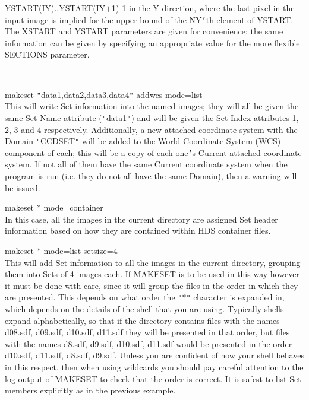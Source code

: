 \documentclass[twoside,11pt]{article}
\renewcommand{\_}{\texttt{\symbol{95}}}
\newcommand{\routine}[1]{{\sc #1}}
\newcommand{\sstexamples}[1]{
   \item[Examples:] \mbox{} \\
   \vspace{-3.5ex}
   \begin{description}
      #1
   \end{description}
}
\newcommand{\sstexamplesubsection}[2]{\sloppy \item{\ssttt #1} \mbox{} \\ #2 }
\newcommand{\sstexamples}[1]{
      \item[Examples:] \\
      \begin{description}
         #1
      \end{description}
      \\
   }
\newcommand{\sstexamplesubsection}[2]{\item[{\ssttt #1}] #2}
\begin{document}
{{{         YSTART(IY)..YSTART(IY$+$1)-1 in the Y direction, where the
         last pixel in the input image is implied for the upper
         bound of the NY{\tt '}th element of YSTART.  The
         XSTART and YSTART parameters are given for convenience; the
         same information can be given by specifying an appropriate
         value for the more flexible SECTIONS parameter.
      }
   }
   \sstexamples{
      \sstexamplesubsection{
         makeset {\tt "}data1,data2,data3,data4{\tt "} addwcs mode=list
      }{
         This will write Set information into the named images; they will
         all be given the same Set Name attribute ({\tt "}data1{\tt "}) and will
         be given the Set Index attributes 1, 2, 3 and 4 respectively.
         Additionally, a new attached coordinate system with the Domain
         {\tt "}CCD\_SET{\tt "} will be added to the World Coordinate System (WCS)
         component of each; this will be a copy of each one{\tt '}s Current
         attached coordinate system.  If not all of them have the
         same Current coordinate system when the program is run
         (i.e. they do not all have the same Domain), then a warning
         will be issued.
      }
      \sstexamplesubsection{
         makeset $*$ mode=container
      }{
         In this case, all the images in the current directory are
         assigned Set header information based on how they are
         contained within HDS container files.
      }
      \sstexamplesubsection{
         makeset $*$ mode=list setsize=4
      }{
         This will add Set information to all the images in the current
         directory, grouping them into Sets of 4 images each.  If \routine{MAKESET}
         is to be used in this way however it must be done with care,
         since it will group the files in the order in which they
         are presented.  This depends on what order the {\tt "}$*${\tt "} character
         is expanded in, which depends on the details of the shell
         that you are using.  Typically shells expand alphabetically,
         so that if the directory contains files with the names
         d08.sdf, d09.sdf, d10.sdf, d11.sdf they will be presented
         in that order, but files with the names d8.sdf, d9.sdf,
         d10.sdf, d11.sdf would be presented in the order d10.sdf,
         d11.sdf, d8.sdf, d9.sdf.  Unless you are confident of how
         your shell behaves in this respect, then when using wildcards
         you should pay careful attention to the log output of
         MAKESET to check that the order is correct.  It is safest
         to list Set members explicitly as in the previous example.
}}}
\end{document}
